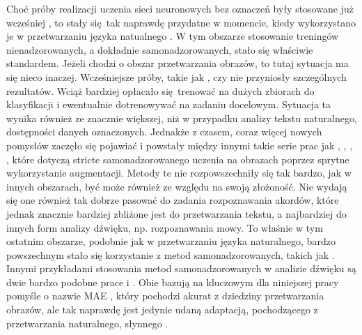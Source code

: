 Choć próby realizacji uczenia sieci neuronowych bez oznaczeń były stosowane już wcześniej \cite{noroozi_unsupervised_2017}, to stały się tak naprawdę przydatne w momencie, kiedy wykorzystano je w przetwarzaniu języka natualnego \cite{devlin_bert_2019}. W tym obszarze stosowanie treningów nienadzorowanych, a dokładnie samonadzorowanych, stało się właściwie standardem. Jeżeli chodzi o obszar przetwarzania obrazów, to tutaj sytuacja ma się nieco inaczej. Wcześniejsze próby, takie jak \cite{pathak_context_2016}, czy \cite{noroozi_unsupervised_2017} nie przyniosły szczególnych rezultatów. Wciąż bardziej opłacało się trenować na dużych zbiorach do klasyfikacji i ewentualnie dotrenowywać na zadaniu docelowym. Sytuacja ta wynika również ze znacznie większej, niż w przypadku analizy tekstu naturalnego, dostępności danych oznaczonych. Jednakże z czasem, coraz więcej nowych pomysłów zaczęło się pojawiać i powstały między innymi takie serie prac jak \cite{chen_simple_2020}, \cite{grill_bootstrap_2020}, \cite{caron_unsupervised_2021}, \cite{caron_emerging_2021}, które dotyczą stricte samonadzorowanego uczenia na obrazach poprzez sprytne wykorzystanie augmentacji. Metody te nie rozpowszechniły się tak bardzo, jak w innych obszarach, być może również ze względu na swoją złożoność. Nie wydają się one również tak dobrze pasować do zadania rozpoznawania akordów, które jednak znacznie bardziej zbliżone jest do przetwarzania tekstu, a najbardziej do innych form analizy dźwięku, np. rozpoznawania mowy. To właśnie w tym ostatnim obszarze, podobnie jak w przetwarzaniu języka naturalnego, bardzo powszechnym stało się korzystanie z metod samonadzorowanych, takich jak \cite{baevski_wav2vec_2020}. Innymi przykładami stosowania metod samonadzorowanych w analizie dźwięku są dwie bardzo podobne prace \cite{baade_mae-ast_2022} i \cite{he_masked_2021}. Obie bazują na kluczowym dla niniejszej pracy pomyśle o nazwie MAE \cite{he_masked_2021}, który pochodzi akurat z dziedziny przetwarzania obrazów, ale tak naprawdę jest jedynie udaną adaptacją, pochodzącego z przetwarzania naturalnego, słynnego \cite{devlin_bert_2019}.

